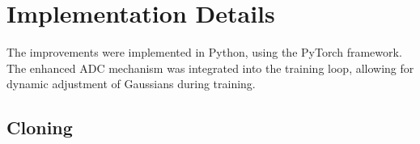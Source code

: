 \documentclass[11pt]{report}
\begin{document}

\section{Implementation Details}
The improvements were implemented in Python, using the PyTorch framework. The enhanced ADC mechanism was integrated into the training loop, allowing for dynamic adjustment of Gaussians during training.

\subsection{Cloning}
\end{document}
